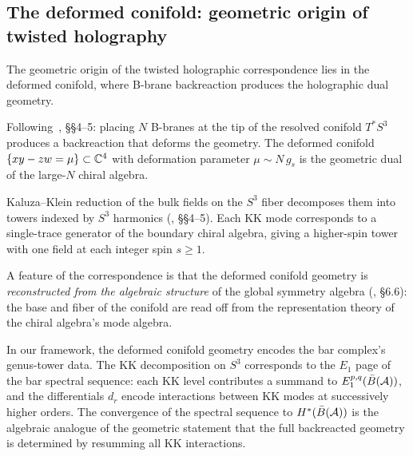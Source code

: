 \subsection{The deformed conifold: geometric origin of twisted holography}

The geometric origin of the twisted holographic correspondence lies in
the deformed conifold, where B-brane backreaction produces the
holographic dual geometry.

\begin{proposition}
Following~\cite{CG18}, \S\S4--5: placing $N$ B-branes at the tip of the
resolved conifold $T^*S^3$ produces a backreaction that deforms the
geometry. The deformed conifold $\{xy - zw = \mu\} \subset \mathbb C^4$ with
deformation parameter $\mu \sim N\,g_s$ is the geometric dual of the
large-$N$ chiral algebra.
\end{proposition}

\begin{proposition}
Kaluza--Klein reduction of the bulk fields on the $S^3$ fiber
decomposes them into towers indexed by $S^3$ harmonics
\textup{(}\!\cite{CG18}, \S\S4--5\textup{)}. Each KK mode corresponds
to a single-trace generator of the boundary chiral algebra, giving a
higher-spin tower with one field at each integer spin $s \geq 1$.
\end{proposition}

\begin{remark}
A feature of the correspondence is that the deformed conifold
geometry is \emph{reconstructed from the algebraic structure} of the
global symmetry algebra \textup{(}\!\cite{CG18}, \S6.6\textup{)}: the
base and fiber of the conifold are read off from the representation
theory of the chiral algebra's mode algebra.
\end{remark}

\begin{remark}
In our framework, the deformed conifold geometry encodes the bar
complex's genus-tower data. The KK decomposition on $S^3$ corresponds
to the $E_1$ page of the bar spectral sequence: each KK level
contributes a summand to $E_1^{p,q}(\bar{B}(\mathcal A))$, and the
differentials $d_r$ encode interactions between KK modes at successively
higher orders. The convergence of the spectral sequence to
$H^*(\bar{B}(\mathcal A))$ is the algebraic analogue of the geometric statement
that the full backreacted geometry is determined by resumming all
KK interactions.
\end{remark}

